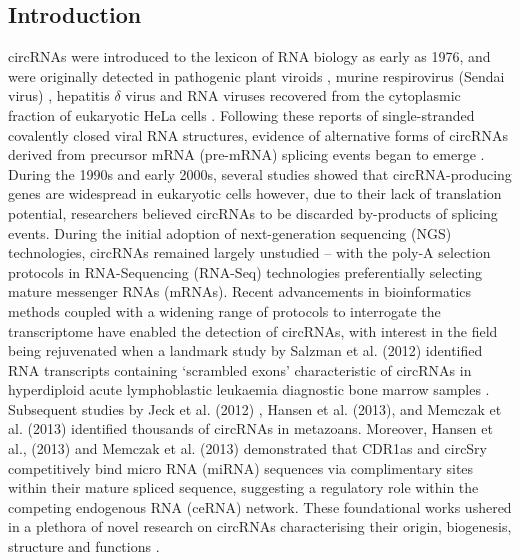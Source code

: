 \subsection{Introduction}
circRNAs were introduced to the lexicon of RNA biology as early as 1976, and were originally detected in pathogenic plant viroids \cite{Sanger1976}, murine respirovirus (Sendai virus) \cite{Kolakofsky1976Aug}, hepatitis $\delta$ virus \cite{Kos1986Oct} and RNA viruses recovered from the cytoplasmic fraction of eukaryotic HeLa cells \cite{Hsu1979Jul}. Following these reports of single-stranded covalently closed viral RNA structures, evidence of alternative forms of circRNAs derived from precursor mRNA (pre-mRNA) splicing events began to emerge \cite{Grabowski1981Feb,Kruger1982Nov,Zaug1983Feb}. During the 1990s and early 2000s, several studies showed that circRNA-producing genes are widespread in eukaryotic cells \cite{Nigro1991Feb,Cocquerelle1992Mar,Qian1992,Cocquerelle1993Jan,Capel1993Jun,Zaphiropoulos1996,Zaphiropoulos1997Jun,Surono1999Mar,Li1999Mar,Houseley2006May,Burd2010Dec} however, due to their lack of translation potential, researchers believed circRNAs to be discarded by-products of splicing events. During the initial adoption of next-generation sequencing (NGS) technologies, circRNAs remained largely unstudied -- with the poly-A selection protocols in RNA-Sequencing (RNA-Seq) technologies preferentially selecting mature messenger RNAs (mRNAs). Recent advancements in bioinformatics methods coupled with a widening range of protocols to interrogate the transcriptome have enabled the detection of circRNAs, with interest in the field being rejuvenated when a landmark study by Salzman et al. (2012) identified RNA transcripts containing `scrambled exons' characteristic of circRNAs in hyperdiploid acute lymphoblastic leukaemia diagnostic bone marrow samples \cite{Salzman2012}. Subsequent studies by Jeck et al. (2012) \cite{Jeck2012Dec}, Hansen et al. (2013), \cite{Hansen2013Mar} and Memczak et al. (2013) \cite{findcirc} identified thousands of circRNAs in metazoans. Moreover, Hansen et al., (2013) \cite{Hansen2013Mar} and Memczak et al. (2013) \cite{findcirc} demonstrated that CDR1as and circSry competitively bind micro RNA (miRNA) sequences via complimentary sites within their mature spliced sequence, suggesting a regulatory role within the competing endogenous RNA (ceRNA) network. These foundational works ushered in a plethora of novel research on circRNAs characterising their origin, biogenesis, structure and functions \cite{Danan2012Apr, Jeck2014May, Ashwal-Fluss2014Oct, Chen2015Apr}. \par


